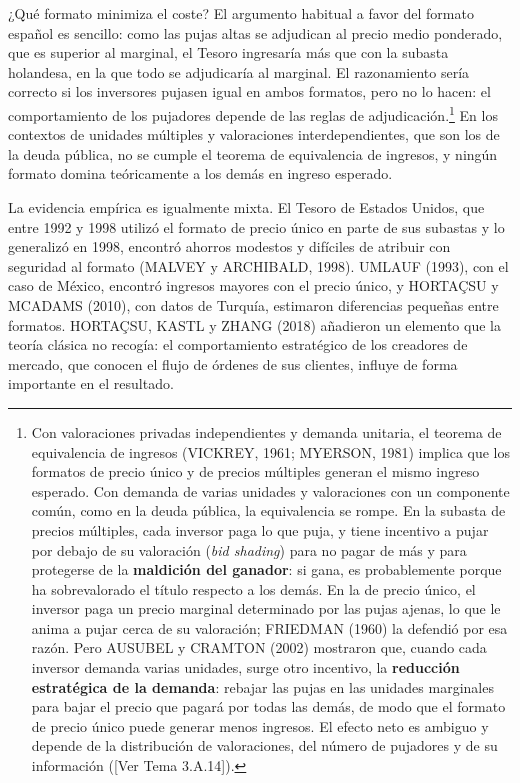 \documentclass[10pt,a4paper]{article}
\newcommand{\authorfont}[1]{{\fontfamily{EBGaramond-TLF}\selectfont #1}}
\begin{document}
¿Qué formato minimiza el coste? El argumento habitual a favor del formato español es sencillo: como las pujas altas se adjudican al precio medio ponderado, que es superior al marginal, el Tesoro ingresaría más que con la subasta holandesa, en la que todo se adjudicaría al marginal. El razonamiento sería correcto si los inversores pujasen igual en ambos formatos, pero no lo hacen: el comportamiento de los pujadores depende de las reglas de adjudicación.\footnote{Con valoraciones privadas independientes y demanda unitaria, el teorema de equivalencia de ingresos (VICKREY, 1961; MYERSON, 1981) implica que los formatos de precio único y de precios múltiples generan el mismo ingreso esperado. Con demanda de varias unidades y valoraciones con un componente común, como en la deuda pública, la equivalencia se rompe. En la subasta de precios múltiples, cada inversor paga lo que puja, y tiene incentivo a pujar por debajo de su valoración (\textit{bid shading}) para no pagar de más y para protegerse de la \textbf{maldición del ganador}: si gana, es probablemente porque ha sobrevalorado el título respecto a los demás. En la de precio único, el inversor paga un precio marginal determinado por las pujas ajenas, lo que le anima a pujar cerca de su valoración; FRIEDMAN (1960) la defendió por esa razón. Pero AUSUBEL y CRAMTON (2002) mostraron que, cuando cada inversor demanda varias unidades, surge otro incentivo, la \textbf{reducción estratégica de la demanda}: rebajar las pujas en las unidades marginales para bajar el precio que pagará por todas las demás, de modo que el formato de precio único puede generar menos ingresos. El efecto neto es ambiguo y depende de la distribución de valoraciones, del número de pujadores y de su información ([\authorfont{Ver Tema 3.A.14}]).
} En los contextos de unidades múltiples y valoraciones interdependientes, que son los de la deuda pública, no se cumple el teorema de equivalencia de ingresos, y ningún formato domina teóricamente a los demás en ingreso esperado.

La evidencia empírica es igualmente mixta. El Tesoro de Estados Unidos, que entre 1992 y 1998 utilizó el formato de precio único en parte de sus subastas y lo generalizó en 1998, encontró ahorros modestos y difíciles de atribuir con seguridad al formato (MALVEY y ARCHIBALD, 1998). UMLAUF (1993), con el caso de México, encontró ingresos mayores con el precio único, y HORTAÇSU y MCADAMS (2010), con datos de Turquía, estimaron diferencias pequeñas entre formatos. HORTAÇSU, KASTL y ZHANG (2018) añadieron un elemento que la teoría clásica no recogía: el comportamiento estratégico de los creadores de mercado, que conocen el flujo de órdenes de sus clientes, influye de forma importante en el resultado.
\end{document}
